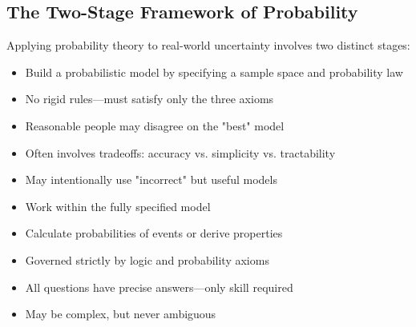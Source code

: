 \subsection{The Two-Stage Framework of Probability}

Applying probability theory to real-world uncertainty involves two distinct stages:

\begin{itemize}
    \item Build a probabilistic model by specifying a sample space and probability law
    \item No rigid rules—must satisfy only the three axioms
    \item Reasonable people may disagree on the "best" model
    \item Often involves tradeoffs: accuracy vs. simplicity vs. tractability
    \item May intentionally use "incorrect" but useful models
\end{itemize}

\begin{itemize}
    \item Work within the fully specified model
    \item Calculate probabilities of events or derive properties
    \item Governed strictly by logic and probability axioms
    \item All questions have precise answers—only skill required
    \item May be complex, but never ambiguous
\end{itemize}


